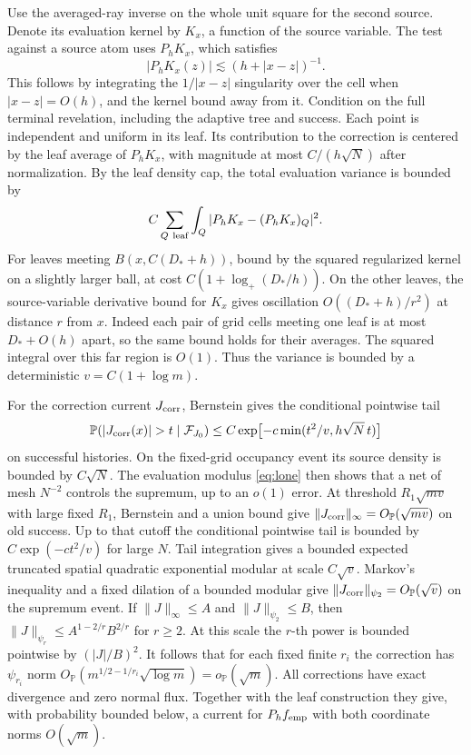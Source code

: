 \documentclass[11pt]{article}
\newcommand{\PP}{\mathbb P}
\begin{document}
Use the averaged-ray inverse on the whole unit square for
the second source. Denote its evaluation kernel by \(K_x\),
a function of the source variable. The test against a
source atom uses \(P_hK_x\), which satisfies
\[
 |P_hK_x(z)|\lesssim (h+|x-z|)^{-1}.
\]
This follows by integrating the \(1/|x-z|\) singularity over
the cell when \(|x-z|=O(h)\), and the kernel bound away from it.
Condition on the full terminal revelation, including the
adaptive tree and success. Each point is independent and
uniform in its leaf. Its contribution to the correction
is centered by the leaf average of \(P_h K_x\), with magnitude
at most \(C/(h\sqrt N)\) after normalization. By the leaf
density cap, the total evaluation variance is bounded by
\[
 C\sum_{Q\ {\rm leaf}}\int_Q |P_hK_x-(P_hK_x)_Q|^2.
\]
For leaves meeting \(B(x,C(D_*+h))\), bound by the squared
regularized kernel on a slightly larger ball, at cost
\(C(1+\log_+(D_*/h))\). On the other leaves, the
source-variable derivative bound for \(K_x\) gives oscillation
\(O((D_*+h)/r^2)\) at distance \(r\) from \(x\).
Indeed each pair of grid cells meeting one leaf is at most
\(D_*+O(h)\) apart, so the same bound holds for their
averages. The squared integral over this far region is
\(O(1)\). Thus the variance is bounded by a deterministic
\(v=C(1+\log m)\).

For the correction current \(J_{\rm corr}\), Bernstein gives the
conditional pointwise tail
\[
 \PP(|J_{\rm corr}(x)|>t\mid\mathcal F_{J_0})
   \le C\exp\bigl[-c\min(t^2/v,h\sqrt N\,t)\bigr]
\]
on successful histories.
On the fixed-grid occupancy event its source density is
bounded by \(C\sqrt N\). The evaluation modulus \eqref{eq:lone}
then shows that a net of mesh \(N^{-2}\) controls the supremum,
up to an \(o(1)\) error. At threshold \(R_1\sqrt{mv}\) with
large fixed \(R_1\), Bernstein and a union bound give
\(\|J_{\rm corr}\|_\infty=O_{\PP}(\sqrt{mv})\) on old success.
Up to that cutoff the conditional pointwise tail is bounded
by \(C\exp(-ct^2/v)\) for large \(N\).
Tail integration gives a bounded expected truncated spatial
quadratic exponential modular at scale \(C\sqrt v\).
Markov's inequality and a fixed dilation of a bounded
modular give \(\|J_{\rm corr}\|_{\psi_2}=O_{\PP}(\sqrt v)\)
on the supremum event. If \(\|J\|_\infty\le A\) and
\(\|J\|_{\psi_2}\le B\), then
\(\|J\|_{\psi_r}\le A^{1-2/r}B^{2/r}\) for \(r\ge2\).
At this scale the \(r\)-th power is bounded pointwise
by \((|J|/B)^2\). It follows that for each fixed finite \(r_i\)
the correction has \(\psi_{r_i}\) norm
\(O_{\PP}(m^{1/2-1/r_i}\sqrt{\log m})=o_{\PP}(\sqrt m)\).
All corrections have exact divergence and zero normal flux.
Together with the leaf construction they give, with
probability bounded below, a current for \(P_h f_{\rm emp}\)
with both coordinate norms \(O(\sqrt m)\).
\end{document}
